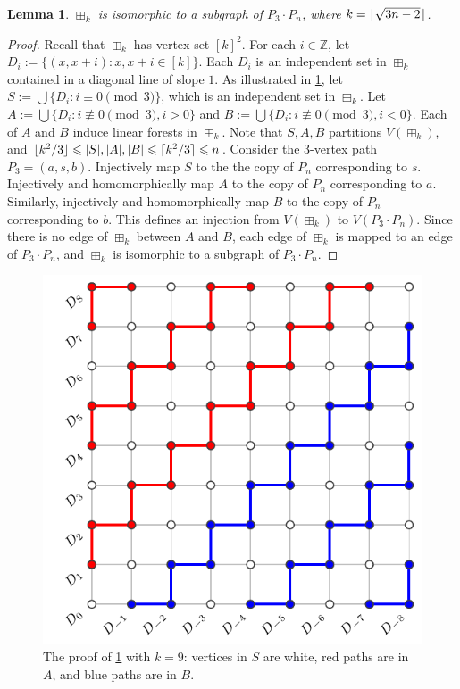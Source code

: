 \documentclass{patmorin}
\DeclarePairedDelimiter{\floor}{\lfloor}{\rfloor}
\DeclarePairedDelimiter{\ceil}{\lceil}{\rceil}
\renewcommand{\leq}{\leqslant}
\theoremstyle{plain}
\newtheorem{lem}[thm]{Lemma}
\theoremstyle{definition}
\begin{document}
\begin{lem}
$\boxplus_k$ is isomorphic to a subgraph of $P_3 \cdot P_n$, where $k=\floor{\sqrt{3n-2}}$.
\label{LexST}
\end{lem}

\begin{proof}
Recall that $\boxplus_{k}$ has vertex-set $[k]^2$. 
For each $i\in\mathbb{Z}$, let $D_i:=\{(x,x+i):x,x+i\in[k]\}$. Each $D_i$ is an independent set in $\boxplus_{k}$ contained in a diagonal line of slope $1$. 
As illustrated in \cref{LexSTfig}, 
let $S:=\bigcup\{D_{i}:i\equiv 0\pmod{3}\}$, 
which is an independent set in $\boxplus_k$. 
Let $A:=\bigcup\{D_{i}:i\not\equiv 0\pmod{3}, i>0\}$ and
 $B:=\bigcup\{D_{i}:i\not\equiv 0\pmod{3}, i<0\}$. 
Each of $A$ and $B$ induce linear forests in $\boxplus_k$.  
Note that $S,A,B$ partitions $V(\boxplus_k)$, and $\floor{k^2/3}\leq|S|,|A|,|B|\leq\ceil{k^2/3}\leq n$. 
Consider the 3-vertex path $P_3=(a,s,b)$. 
Injectively map $S$ to the the copy of $P_n$ corresponding to $s$. Injectively and homomorphically map $A$ to the copy of $P_n$ corresponding to $a$. Similarly, injectively and homomorphically map $B$ to the copy of $P_n$ corresponding to $b$. This defines an injection from $V(\boxplus_k)$ to $V(P_3\cdot P_n)$. Since there is no edge of $\boxplus_k$ between $A$ and $B$, each edge of $\boxplus_k$ is mapped to an edge of $P_3\cdot P_n$, and $\boxplus_k$ is isomorphic to a subgraph of $P_3\cdot P_n$.
\end{proof}


\begin{figure}[ht]
\centering
\includegraphics[scale=0.7]{figs/LexST.pdf}
\caption{The proof of \cref{LexST} with $k=9$: vertices in $S$ are white, red paths are in $A$, and blue paths are in $B$.}
\label{LexSTfig}
\end{figure}
\end{document}
